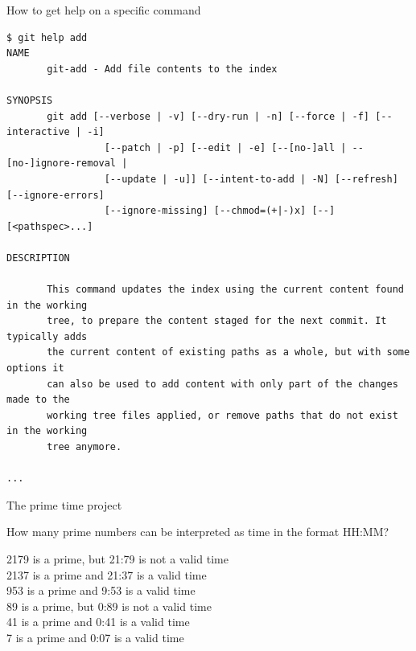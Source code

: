 \documentclass[svgnames]{beamer}
\begin{document}
\begin{frame}[fragile]{How to get help on a specific command}

 \addtolength\linewidth{0.5truecm}
 \begin{lstlisting}[basicstyle={\ttfamily\tiny}]
$ git help add
NAME
       git-add - Add file contents to the index

SYNOPSIS
       git add [--verbose | -v] [--dry-run | -n] [--force | -f] [--interactive | -i]
                 [--patch | -p] [--edit | -e] [--[no-]all | --[no-]ignore-removal |
                 [--update | -u]] [--intent-to-add | -N] [--refresh] [--ignore-errors]
                 [--ignore-missing] [--chmod=(+|-)x] [--] [<pathspec>...]

DESCRIPTION

       This command updates the index using the current content found in the working
       tree, to prepare the content staged for the next commit. It typically adds
       the current content of existing paths as a whole, but with some options it
       can also be used to add content with only part of the changes made to the
       working tree files applied, or remove paths that do not exist in the working
       tree anymore.

...
 \end{lstlisting}
\end{frame}

\begin{frame}{The prime time project}
 \textit{}

 How many prime numbers can be interpreted as time in the format HH:MM?

 \vspace{1\baselineskip}
 \textit{}

 \textcolor{wrong}{2179 is a prime, but 21:79 is not a valid time}\\
 \textcolor{right}{2137 is a prime and 21:37 is a valid time}\\
 \textcolor{right}{953 is a prime and 9:53 is a valid time}\\
 \textcolor{wrong}{89 is a prime, but 0:89 is not a valid time}\\
 \textcolor{right}{41 is a prime and 0:41 is a valid time}\\
 \textcolor{right}{7 is a prime and 0:07 is a valid time}

 \vspace{1.5\baselineskip}
 \begin{center}
 \end{center}
\end{frame}
\end{document}
